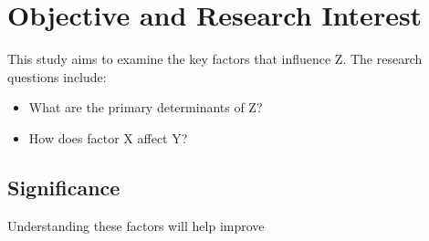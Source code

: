 \section{Objective and Research Interest}
This study aims to examine the key factors that influence Z. 
The research questions include:

\begin{itemize}
    \item What are the primary determinants of Z\@?
    \item How does factor X affect Y\@?
\end{itemize}

\subsection{Significance}
Understanding these factors will help improve
\lipsum[1]
